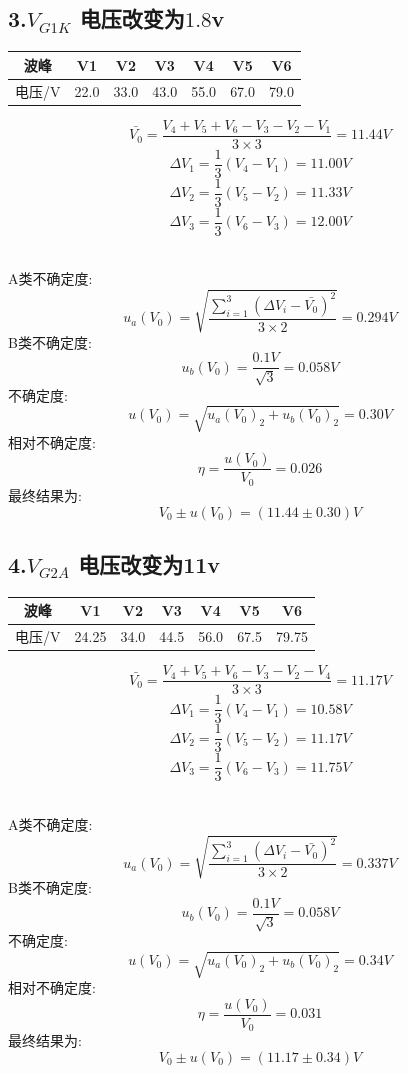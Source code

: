 \documentclass[11pt,a4paper,oneside]{article}
\begin{document}
\subsection*{3.$V_{G1K}$ 电压改变为$1.8$v}
\begin{center}
\begin{tabular}{|c|c|c|c|c|c|c|}
	\hline
	波峰&V1&V2&V3&V4&V5&V6
	\\\hline
	电压/V&22.0&33.0&43.0&55.0&67.0&79.0\\\hline
	\end{tabular}
	\end{center}

$$  \bar{V_0}=\frac{V_4+V_5+V_6-V_3-V_2-V_1}{3\times 3}=11.44V $$
$$	\Delta V_1=\frac{1}{3}(V_4-V_1)=11.00V $$
$$	\Delta V_2=\frac{1}{3}(V_5-V_2)=11.33V $$
$$	\Delta V_3=\frac{1}{3}(V_6-V_3)=12.00V $$ 

\ \\
A类不确定度:
$$	u_a(V_0)=\sqrt{\frac{\sum\limits_{i=1}^{3} (\Delta V_i-\bar{V_0})^2}{3\times 2}}=0.294V $$
B类不确定度:
$$	u_b(V_0)=\frac{0.1V}{\sqrt{3}}=0.058V $$
不确定度:
$$	u(V_0)=\sqrt{u_a(V_0)_2+u_b(V_0)_2}=0.30V $$
相对不确定度:
$$	\eta=\frac{u(V_0)}{V_0}=0.026 $$
最终结果为:
$$	V_0 \pm u(V_0) = (11.44 \pm 0.30)V $$


\subsection*{4.$V_{G2A}$ 电压改变为11v}
\begin{center}
\begin{tabular}{|c|c|c|c|c|c|c|}
	\hline
	波峰&V1&V2&V3&V4&V5&V6
	\\\hline
	电压/V&24.25&34.0&44.5&56.0&67.5&79.75\\\hline
	\end{tabular}
	\end{center}

$$  \bar{V_0}=\frac{V_4+V_5+V_6-V_3-V_2-V_4}{3\times 3}=11.17V $$
$$	\Delta V_1=\frac{1}{3}(V_4-V_1)=10.58V $$
$$	\Delta V_2=\frac{1}{3}(V_5-V_2)=11.17V $$
$$	\Delta V_3=\frac{1}{3}(V_6-V_3)=11.75V $$ 

\ \\
A类不确定度:
$$	u_a(V_0)=\sqrt{\frac{\sum\limits_{i=1}^{3} (\Delta V_i-\bar{V_0})^2}{3\times 2}}=0.337V $$
B类不确定度:
$$	u_b(V_0)=\frac{0.1V}{\sqrt{3}}=0.058V $$
不确定度:
$$	u(V_0)=\sqrt{u_a(V_0)_2+u_b(V_0)_2}=0.34V $$
相对不确定度:
$$	\eta=\frac{u(V_0)}{V_0}=0.031 $$
最终结果为:
$$	V_0 \pm u(V_0) = (11.17 \pm 0.34)V $$
\end{document}
